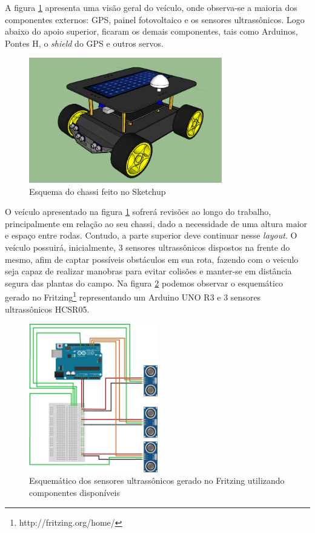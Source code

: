 A figura \ref{fig:sketchup:vaa} apresenta uma visão geral do veículo, onde observa-se a maioria dos componentes externos: GPS, painel fotovoltaico e os sensores ultrassônicos. Logo abaixo do apoio superior, ficaram os demais componentes, tais como Arduinos, Pontes H, o \textit{shield} do GPS e outros servos. 
\begin{figure}[H]
    \centering
    \includegraphics[width=0.75\textwidth]{figuras/chassi_vaa_completo.png}
    \caption{Esquema do chassi feito no Sketchup}
    \label{fig:sketchup:vaa}
\end{figure}
O veículo apresentado na figura \ref{fig:sketchup:vaa} sofrerá revisões ao longo do trabalho, principalmente em relação ao seu chassi, dado a necessidade de uma altura maior e espaço entre rodas. Contudo, a parte superior deve continuar nesse \textit{layout}.
O veículo possuirá, inicialmente, 3 sensores ultrassônicos dispostos na frente do mesmo, afim de captar possíveis obstáculos em sua rota, fazendo com o veiculo seja capaz de realizar manobras para evitar colisões e manter-se em distância segura das plantas do campo. Na figura \ref{fig:ultrasonico:vaa} podemos observar o esquemático gerado no Fritzing\footnote{http://fritzing.org/home/} representando um Arduino UNO R3 e 3 sensores ultrassônicos HCSR05.
\begin{figure}[H]
    \centering
    \includegraphics[width=0.5\textwidth]{figuras/ULTRASSONICO.png}
    \caption{Esquemático dos sensores ultrassônicos gerado no Fritzing utilizando componentes disponíveis}
    \label{fig:ultrasonico:vaa}
\end{figure}

